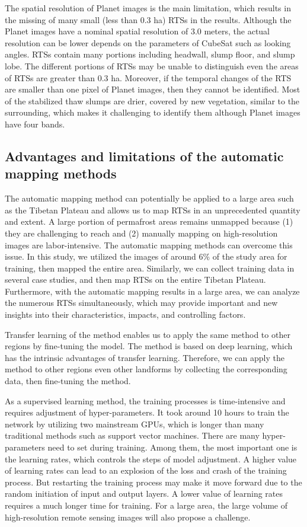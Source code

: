 \documentclass[preprint,12pt,authoryear]{elsarticle}
\begin{document}
The spatial resolution of Planet images is the main limitation, which results in the missing of many small (less than 0.3 ha) RTSs in the results. Although the Planet images have a nominal spatial resolution of 3.0 meters, the actual resolution can be lower depends on the parameters of CubeSat such as looking angles.
RTSs contain many portions including headwall, slump floor, and slump lobe. The different portions of RTSs may be unable to distinguish even the areas of RTSs are greater than 0.3 ha. Moreover, if the temporal changes of the RTS are smaller than one pixel of Planet images, then they cannot be identified. Most of the stabilized thaw slumps are drier, covered by new vegetation, similar to the surrounding, which makes it challenging to identify them although Planet images have four bands.

\subsection{Advantages and limitations of the automatic mapping methods}
\label{subsec_advantage_limitation_method}

The automatic mapping method can potentially be applied to a large area such as the Tibetan Plateau and allows us to map RTSs in an unprecedented quantity and extent. A large portion of permafrost areas remains unmapped because (1) they are challenging to reach and (2) manually mapping on high-resolution images are labor-intensive. The automatic mapping methods can overcome this issue. In this study, we utilized the images of around 6\% of the study area for training, then mapped the entire area. Similarly, we can collect training data in several case studies, and then map RTSs on the entire Tibetan Plateau. Furthermore, with the automatic mapping results in a large area, we can analyze the numerous RTSs simultaneously, which may provide important and new insights into their characteristics, impacts, and controlling factors.  

Transfer learning of the method enables us to apply the same method to other regions by fine-tuning the model. The method is based on deep learning, which has the intrinsic advantages of transfer learning. Therefore, we can apply the method to other regions even other landforms by collecting the corresponding data, then fine-tuning the method. 

As a supervised learning method, the training processes is time-intensive and requires adjustment of hyper-parameters. It took around 10 hours to train the network by utilizing two mainstream GPUs, which is longer than many traditional methods such as support vector machines. There are many hyper-parameters need to set during training. Among them, the most important one is the learning rates, which controls the steps of model adjustment. A higher value of learning rates can lead to an explosion of the loss and crash of the training process. But restarting the training process may make it move forward due to the random initiation of input and output layers. A lower value of learning rates requires a much longer time for training. For a large area, the large volume of high-resolution remote sensing images will also propose a challenge.
\end{document}
